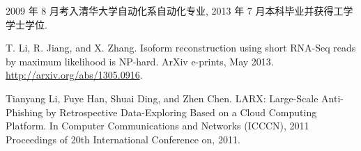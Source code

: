 \begin{resume}


  
  2009 年 8 月考入清华大学自动化系自动化专业, 2013 年 7 月本科毕业并获得工学学士学位. 


  \begin{enumerate}[{[}1{]}]
	\item T. Li, R. Jiang, and X. Zhang. 
	Isoform reconstruction using short RNA-Seq reads by maximum likelihood is NP-hard. 
	ArXiv e-prints, May 2013. \url{http://arxiv.org/abs/1305.0916}.

	\item Tianyang Li, Fuye Han, Shuai Ding, and Zhen Chen. 
	LARX: Large-Scale Anti-Phishing by Retrospective Data-Exploring Based on a Cloud Computing Platform. 
	In Computer Communications and Networks (ICCCN), 2011 
	Proceedings of 20th International Conference on, 2011.
  \end{enumerate}
  
\end{resume}
